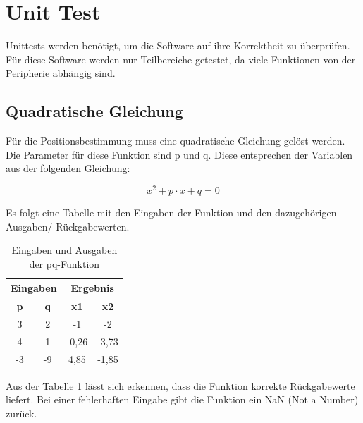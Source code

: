 \newpage
\section{Unit Test}
Unittests werden benötigt, um die Software auf ihre Korrektheit zu überprüfen. Für diese Software werden nur Teilbereiche getestet, da viele Funktionen von der Peripherie abhängig sind.

\subsection{Quadratische Gleichung}
Für die Positionsbestimmung muss eine quadratische Gleichung gelöst werden. Die Parameter für diese Funktion sind \si{p} und \si{q}. Diese entsprechen der Variablen aus der folgenden Gleichung:

\begin{equation}
\label{eq:unit_test_pq_formel}
x^{2} + p \cdot x + q = 0
\end{equation}

Es folgt eine Tabelle mit den Eingaben der Funktion und den dazugehörigen Ausgaben/ Rückgabewerten. 

\begin{table}[H]
\centering
\caption{Eingaben und Ausgaben der pq-Funktion}
\label{table:pq_funktion}
\begin{tabular}{|c|c|c|c|}
\hline
\multicolumn{2}{|c|}{\textbf{Eingaben}} & \multicolumn{2}{c|}{\textbf{Ergebnis}} \\ \hline
\textbf{p}         & \textbf{q}         & \textbf{x1}        & \textbf{x2}       \\ \hline
3                  & 2                  & -1                 & -2                \\ \hline
4                  & 1                  & -0,26                   & -3,73                  \\ \hline
-3                 & -9                 & 4,85                   & -1,85                  \\ \hline
\end{tabular}
\end{table}

Aus der Tabelle \ref{table:pq_funktion} lässt sich erkennen, dass die Funktion korrekte Rückgabewerte liefert. Bei einer fehlerhaften Eingabe gibt die Funktion ein \si{NaN} (Not a Number) zurück.


